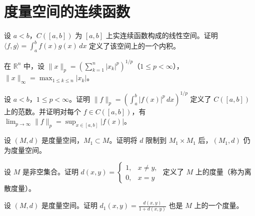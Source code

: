 \renewcommand{\thesection}{\arabic{section}}\renewcommand{\theHsection}{chapter.\arabic{section}}\setcounter{section}{15}\section{度量空间的连续函数}
\noindent\begin{minipage}{\textwidth}
设 $a<b$，$C([a,b])$ 为 $[a,b]$ 上实连续函数构成的线性空间。证明 $\displaystyle\langle f,g\rangle=\int_a^b f(x)g(x)\,dx$ 定义了该空间上的一个内积。
\end{minipage}\par\vfill
\noindent\begin{minipage}{\textwidth}
在 $\mathbb R^n$ 中，设 $\displaystyle\|x\|_p=\left(\sum_{k=1}^n|x_k|^p\right)^{1/p}$（$1\le p<\infty$），$\|x\|_\infty=\max_{1\le k\le n}|x_k|$。
\end{minipage}\par\vfill
\noindent\begin{minipage}{\textwidth}
设 $a<b$，$1\le p<\infty$。证明 $\displaystyle\|f\|_p=\left(\int_a^b|f(x)|^p\,dx\right)^{1/p}$ 定义了 $C([a,b])$ 上的范数。并证明对每个 $f\in C([a,b])$，有 $\displaystyle\lim_{p\to\infty}\|f\|_p=\sup_{x\in[a,b]}|f(x)|$。
\end{minipage}\par\vfill
\noindent\begin{minipage}{\textwidth}
设 $(M,d)$ 是度量空间，$M_1\subset M$。证明将 $d$ 限制到 $M_1\times M_1$ 后，$(M_1,d)$ 仍为度量空间。
\end{minipage}\par\vfill
\newpage
\noindent\begin{minipage}{\textwidth}
设 $M$ 是非空集合。证明 $d(x,y)=\begin{cases}1,&x\ne y,\\0,&x=y\end{cases}$ 定义了 $M$ 上的度量（称为离散度量）。
\end{minipage}\par\vfill
\noindent\begin{minipage}{\textwidth}
设 $(M,d)$ 是度量空间。证明 $\displaystyle d_1(x,y)=\frac{d(x,y)}{1+d(x,y)}$ 也是 $M$ 上的一个度量。
\end{minipage}\par\vfill
